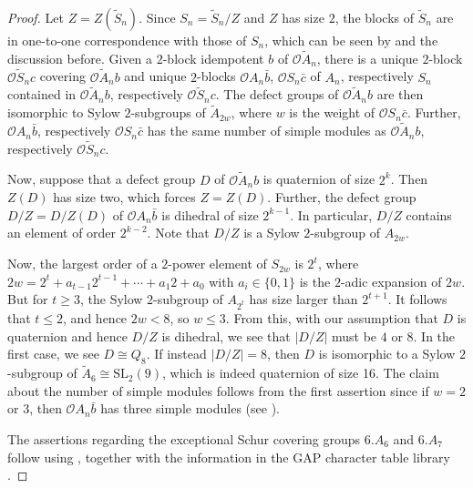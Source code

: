 \documentclass{amsart}
\theoremstyle{plain}\newtheorem{Theorem}{Theorem}[section]
\theoremstyle{plain}\newtheorem{Conjecture}[Theorem]{Conjecture}
\theoremstyle{plain}\newtheorem{Corollary}[Theorem]{Corollary}
\theoremstyle{plain}\newtheorem{Lemma}[Theorem]{Lemma}
\theoremstyle{plain}\newtheorem{Proposition}[Theorem]{Proposition}
\theoremstyle{definition}\newtheorem{Definition}[Theorem]{Definition}
\theoremstyle{definition}\newtheorem{Example}[Theorem]{Example}
\theoremstyle{definition}\newtheorem{Examples}[Theorem]{Examples}
\theoremstyle{definition}\newtheorem{Exercise}[Theorem]{Exercise}
\theoremstyle{definition}\newtheorem{Notation}[Theorem]{Notation}
\theoremstyle{definition}\newtheorem{Remark}[Theorem]{Remark}
\theoremstyle{definition}\newtheorem{Remarks}[Theorem]{Remarks}
\def\CO{{\mathcal{O}}}    \def\OPE{{\mathcal{O}(P\rtimes E)}}
\def\SL{\mathrm{SL}}
\newcommand{\wt}{\widetilde}
\newcommand{\zent} {Z}
\newcommand{\sym}{{S}}
\newcommand{\alt}{{A}}
\numberwithin{equation}{section}
\begin{document}
\begin{proof}
Let $Z=\zent(\wt\sym_n)$.
Since $\sym_n=\wt\sym_n/Z$ and $Z$ has size $2$, the blocks of $\wt\sym_{n}$ are in one-to-one correspondence with those of $\sym_n$, which can be seen by \cite[Thm.~9.9(b)]{N98} and the discussion before. Given a $2$-block idempotent $b$ of $\CO\wt\alt_n$, there is a unique $2$-block $\CO\wt\sym_n c$ covering $\CO\wt\alt_n b$ and unique $2$-blocks $\CO\alt_n\bar b$, $\CO\sym_n\bar c$ of $\alt_n$, respectively $\sym_n$  contained in $\CO\wt\alt_n b$, respectively $\CO\wt\sym_n c$.
The defect groups of $\CO\wt\alt_n b$ are then isomorphic to Sylow $2$-subgroups of $\wt{\alt}_{2w}$, where $w$ is the weight of $\CO\sym_n\bar{c}$. Further, $\CO\alt_n\bar b$, respectively $\CO\sym_n \bar c$ has the same number of  simple modules as $\CO\wt\alt_n b$, respectively $\CO\wt\sym_n c$.

Now, suppose that a defect group $D$ of $\CO\wt\alt_n b$ is quaternion of size $2^k$. Then $\zent(D)$ has size two, which forces $Z=\zent(D)$. Further, the defect group $D/Z=D/\zent(D)$ of $\CO\alt_n\bar b$ is dihedral of size $2^{k-1}$. In particular, $D/Z$ contains an element of order $2^{k-2}$. Note that $D/Z$ is a Sylow $2$-subgroup of $\alt_{2w}$. 

Now, the largest order of a $2$-power element of $\sym_{2w}$ is $2^t$, where $2w=2^t+a_{t-1}2^{t-1}+\cdots+a_1 2+a_0$ with $a_i\in\{0,1\}$ is the $2$-adic expansion of $2w$. But for $t\geq 3$, the Sylow $2$-subgroup of $\alt_{2^t}$ has size larger than $2^{t+1}$. It follows that $t\leq 2$, and hence $2w< 8$, so $w\leq 3$. From this, with our assumption that $D$ is quaternion and hence $D/Z$ is dihedral, we see that $|D/Z|$ must be $4$ or $8$. In the first case, we see $D \cong Q_8$.
If instead $|D/Z|=8$, then $D$ is isomorphic to a Sylow $2$-subgroup of $\wt\alt_{6}\cong \SL_2(9)$, which is indeed quaternion of size 16.   The  claim  about  the number of simple modules follows from the   first assertion since   if $w=2 $  or $3$, then $\CO\alt_n\bar b$  has three simple modules (see \cite[Prop.~12.9]{olsson93}).

The  assertions regarding the exceptional Schur covering groups $6.\alt_6$ and $6.\alt_7$  follow using \cite[Thm.~9.9]{N98}, together with the information in the GAP character table library \cite{GAP}.  
\end{proof}
\end{document}
